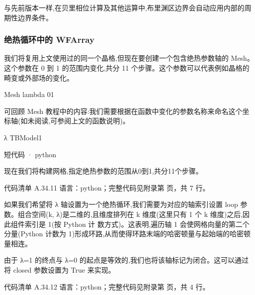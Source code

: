 \documentclass[lang=cn,scheme=chinese,color=blue,device=normal,toc=onecol,math=cm]{elegantbook}
\begin{document}
与先前版本一样,在贝里相位计算及其他运算中,布里渊区边界会自动应用内部的周期性边界条件。\par


\subsubsection{绝热循环中的 WFArray}


我们将复用上文使用过的同一个晶格,但现在要创建一个包含绝热参数轴的 Mesh。这个参数在 0 到 1 的范围内变化,共分 11 个步骤。这个参数可以代表例如晶格的畸变或外部场的变化。\par


Mesh lambda 01\par


可回顾 Mesh 教程中的内容:我们需要根据在函数中变化的参数名称来命名这个坐标轴(如未阅读,可参阅上文的函数说明)。\par


λ TBModel1\par


\begin{inlinecodebox}{短代码 · python}
\end{inlinecodebox}


现在我们将构建网格,指定绝热参数的范围从0到1,共分11个步骤。\par


\begin{codeindexbox}{代码清单 A.34.11}
语言：python；完整代码见附录第 \pageref{code:34:11} 页，共 7 行。
\end{codeindexbox}


如果我们希望将 λ 轴设置为一个绝热循环,我们需要为对应的轴索引设置 loop 参数。组合空间(k, λ)是二维的,且维度排列在 k 维度(这里只有 1 个 k 维度)之后,因此组件索引是 1(按 Python 计 数方式)。这表明,遍历轴 1 会使网格向量的第二个分量(Python 计数为 1)形成环路,从而使得环路末端的哈密顿量与起始端的哈密顿量相连。\par


由于 λ=1 的终点与 λ=0 的起点是等效的,我们也将该轴标记为闭合。这可以通过将 closed 参数设置为 True 来实现。\par


\begin{codeindexbox}{代码清单 A.34.12}
语言：python；完整代码见附录第 \pageref{code:34:12} 页，共 4 行。
\end{codeindexbox}
\end{document}
